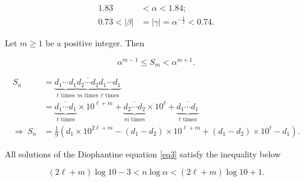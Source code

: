 \documentclass[10pt,a4paper]{amsart}
\begin{document}
\begin{equation}\label{Trib4}
\begin{aligned}
1.83&<\alpha<1.84;\\
0.73 < |\beta|&=|\gamma|=\alpha^{-\frac{1}{2}}< 0.74.
\end{aligned}
\end{equation}

\begin{lemma}\label{lem1}
Let $m \ge 1$ be a positive integer. Then

\begin{equation*}
\alpha^{m-1} \leq S_m < \alpha^{m+1}.
\end{equation*}
\end{lemma}

\begin{align}\label{eq3}
S_n & = \overline{\underbrace{d_1\cdots d_1}_\text{$\ell$ times} \underbrace{d_2\cdots d_2}_\text{$m$ times} \underbrace{d_1\cdots d_1}_\text{$\ell$ times}} \nonumber \\
& = \overline{\underbrace{d_1\cdots d_1}_\text{$\ell$ times}} \times 10^{\ell + m} + \overline{ \underbrace{d_2\cdots d_2}_\text{$m$ times}} \times 10^\ell + \overline{\underbrace{d_1\cdots d_1}_\text{$\ell$ times}} \nonumber \\
\Rightarrow ~S_n & = \frac{1}{9} \left(d_1 \times 10^{2\ell + m} - (d_1 - d_2) \times 10^{\ell+m} + (d_1-d_2) \times 10^\ell -  d_1 \right).
\end{align}

\begin{lemma}\label{l4}
All solutions of the Diophantine equation \eqref{eq3} satisfy the inequality below

\begin{equation*}
(2\ell + m) \log 10 - 3 < n \log \alpha < (2\ell + m) \log 10 + 1.
\end{equation*}

\end{lemma}
\end{document}
